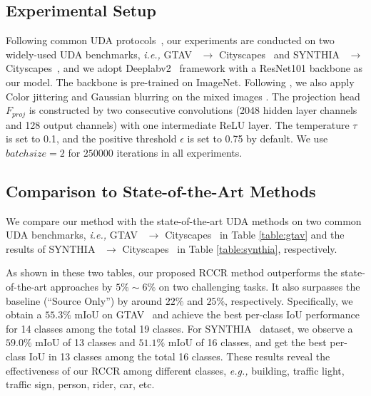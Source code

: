 \documentclass{article}
\begin{document}
\subsection{Experimental Setup}
\label{sec:4.1}
Following common UDA protocols~\cite{AdaptSegNet,SIM,BDL}, our experiments are conducted on two widely-used UDA benchmarks,  \emph{i.e.,} GTAV~\cite{stephan2016gtav} $ \rightarrow $ Cityscapes~\cite{cordts2016cityscapes} and SYNTHIA~\cite{ros2016synthia} $\rightarrow$ Cityscapes~\cite{cordts2016cityscapes}, and we adopt Deeplabv2~\cite{chen2018deeplab} framework with a ResNet101 backbone as our model. The backbone is pre-trained on ImageNet. 
Following \cite{tranheden2020dacs}, we also apply Color jittering and Gaussian blurring on the mixed images . 
The projection head $F_{proj}$ is constructed by two consecutive convolutions (2048 hidden layer channels and 128 output channels) with one intermediate ReLU layer.  The temperature $\tau$ is set to 0.1, and the positive threshold $\epsilon$ is set to 0.75 by default. 
We use $batch size=2$ for $250000$ iterations in all experiments. 

\subsection{Comparison to State-of-the-Art Methods}
\label{sec:4.2}
We compare our method with the state-of-the-art UDA methods on two common UDA benchmarks, \emph{i.e.,} GTAV~\cite{stephan2016gtav} $ \rightarrow $ Cityscapes~\cite{cordts2016cityscapes} in Table \ref{table:gtav} and the results of SYNTHIA~\cite{ros2016synthia} $\rightarrow$ Cityscapes~\cite{cordts2016cityscapes} in Table \ref{table:synthia}, respectively.  

As shown in these two tables, our proposed RCCR method outperforms the state-of-the-art approaches by $5\% \sim 6\%$ on two challenging tasks. It also surpasses the baseline (``Source Only'') by around $22\%$ and $25\%$, respectively. Specifically, we obtain a $55.3\%$ mIoU on GTAV~\cite{stephan2016gtav} and achieve the best per-class IoU performance for 14 classes among the total 19 classes. For SYNTHIA~\cite{ros2016synthia} dataset, we observe a $59.0\%$ mIoU of 13 classes and $51.1\%$ mIoU of 16 classes, and get the best per-class IoU in 13 classes among the total 16 classes. These results reveal the effectiveness of our RCCR among different classes, \emph{e.g.,} building, traffic light, traffic sign, person, rider, car, etc. 
\end{document}
